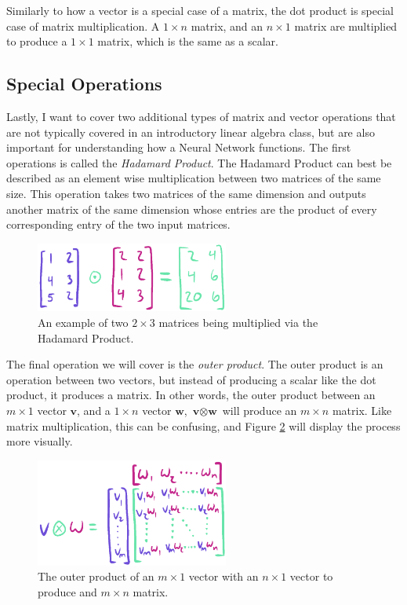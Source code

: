 \documentclass[12pt]{report}
\begin{document}
Similarly to how a vector is a special case of a matrix, the dot product is special case of matrix multiplication. A $1 \times n$ matrix, and an $n \times 1$ matrix are multiplied to produce a $1 \times 1$ matrix, which is the same as a scalar.

\subsection{Special Operations}
Lastly, I want to cover two additional types of matrix and vector operations that are not typically covered in an introductory linear algebra class, but are also important for understanding how a Neural Network functions. The first operations is called the \emph{Hadamard Product}. The Hadamard Product can best be described as an element wise multiplication between two matrices of the same size. This operation takes two matrices of the same dimension and outputs another matrix of the same dimension whose entries are the product of every corresponding entry of the two input matrices.
\begin{figure}[hbt!]
    \centering
    \includegraphics[width=2.5in]{figures/hadamard.PNG}
    \caption{An example of two $2 \times 3$ matrices being multiplied via the Hadamard Product.}
    \label{hadamard}
\end{figure}

The final operation we will cover is the \emph{outer product}. The outer product is an operation between two vectors, but instead of producing a scalar like the dot product, it produces a matrix. In other words, the outer product between an $m \times 1$ vector $\textbf{v}$, and a $1 \times n$ vector $\textbf{w}$, $\textbf{v} \otimes \textbf{w}$ will produce an $m \times n$ matrix. Like matrix multiplication, this can be confusing, and Figure \ref{outerproduct} will display the process more visually.
\begin{figure}[hbt!]
    \centering
    \includegraphics[width=2.5in]{figures/outerproduct.PNG}
    \caption{The outer product of an $m \times 1$ vector with an $n \times 1$ vector to produce and $m \times n$ matrix.}
    \label{outerproduct}
\end{figure}
\end{document}
